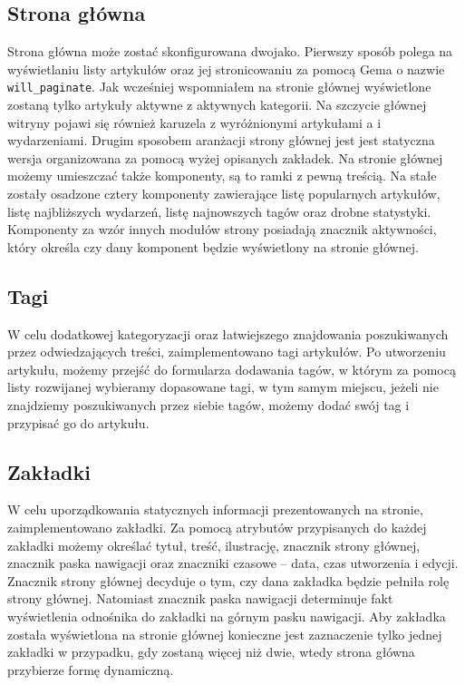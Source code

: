 \documentclass[openright]{xmgr}
\begin{document}
\subsection{Strona główna}
Strona główna może zostać skonfigurowana dwojako. Pierwszy sposób polega na wyświetlaniu listy artykułów oraz jej stronicowaniu za pomocą Gema o nazwie \texttt{will\_paginate}\cite{willpaginate}. Jak wcześniej wspomniałem na stronie głównej wyświetlone zostaną tylko artykuły aktywne z aktywnych kategorii. Na szczycie głównej witryny pojawi się również karuzela z wyróżnionymi artykułami a i wydarzeniami. Drugim sposobem aranżacji strony głównej jest jest statyczna wersja organizowana za pomocą wyżej opisanych zakładek. Na stronie głównej możemy umieszczać także komponenty, są to ramki z pewną treścią. Na stałe zostały osadzone cztery komponenty zawierające listę popularnych artykułów, listę najbliższych wydarzeń, listę najnowszych tagów oraz drobne statystyki. Komponenty za wzór innych modułów strony posiadają znacznik aktywności, który określa czy dany komponent będzie wyświetlony na stronie głównej. 

\subsection{Tagi}
W celu dodatkowej kategoryzacji oraz łatwiejszego znajdowania poszukiwanych przez odwiedzających treści, zaimplementowano tagi artykułów. Po utworzeniu artykułu, możemy przejść do formularza dodawania tagów, w którym za pomocą listy rozwijanej wybieramy dopasowane tagi, w tym samym miejscu, jeżeli nie znajdziemy poszukiwanych przez siebie tagów, możemy dodać swój tag i przypisać go do artykułu.

\subsection{Zakładki}
W celu uporządkowania statycznych informacji prezentowanych na stronie, zaimplementowano zakładki. Za pomocą atrybutów przypisanych do każdej zakładki możemy określać tytuł, treść, ilustrację, znacznik strony głównej, znacznik paska nawigacji oraz znaczniki czasowe – data, czas utworzenia i edycji. Znacznik strony głównej decyduje o tym, czy dana zakładka będzie pełniła rolę strony głównej. Natomiast znacznik paska nawigacji determinuje fakt wyświetlenia odnośnika do zakładki na górnym pasku nawigacji. Aby zakładka została wyświetlona na stronie głównej konieczne jest zaznaczenie tylko jednej zakładki w przypadku, gdy zostaną więcej niż dwie, wtedy strona główna przybierze formę dynamiczną.
\end{document}
